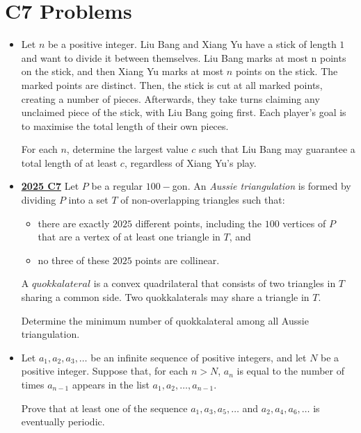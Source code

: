 \documentclass[11pt]{scrartcl}
\begin{document}
\section*{C7 Problems} \label{C7}
\begin{itemize}[leftmargin=*]


\item {} Let $n$ be a positive integer. Liu Bang and Xiang Yu have a stick of length $1$ and want to divide it between themselves. Liu Bang marks at most n points on the stick, and then Xiang Yu marks at most $n$ points on the stick. The marked points are distinct. Then, the stick is cut at all marked points, creating a number of pieces. Afterwards, they take turns claiming any unclaimed piece of the stick, with Liu Bang going first. Each player's goal is to maximise the total length of their own pieces. 

For each $n$, determine the largest value $c$ such that Liu Bang may guarantee a total length of at least $c$, regardless of Xiang Yu's play.

\item \href{https://artofproblemsolving.com/community/c6h3866867p38676971}{\textbf{2025 C7}} Let $P$ be a regular $100-$gon. An \textit{Aussie triangulation} is formed by dividing $P$ into a set $T$ of non-overlapping triangles such that:
    \begin{itemize}[leftmargin=*]
\item[$\bullet$] there are exactly $2025$ different points, including the $100$ vertices of $P$ that are a vertex of at least one triangle in $T$, and
\item[$\bullet$] no three of these $2025$ points are collinear.
\end{itemize}
A $quokkalateral$ is a convex quadrilateral that consists of two triangles in $T$ sharing a common side. Two quokkalaterals may share a triangle in $T$. 

Determine the minimum number of quokkalateral among all Aussie triangulation.
\item {} Let $a_1, a_2, a_3, \dots$ be an infinite sequence of positive integers, and let $N$ be a positive integer. Suppose that, for each $n > N$, $a_n$ is equal to the number of times $a_{n-1}$ appears in the list $a_1, a_2, \dots, a_{n-1}$.

Prove that at least one of the sequence $a_1, a_3, a_5, \dots$ and $a_2, a_4, a_6, \dots$ is eventually periodic.


\end{itemize}
\end{document}
